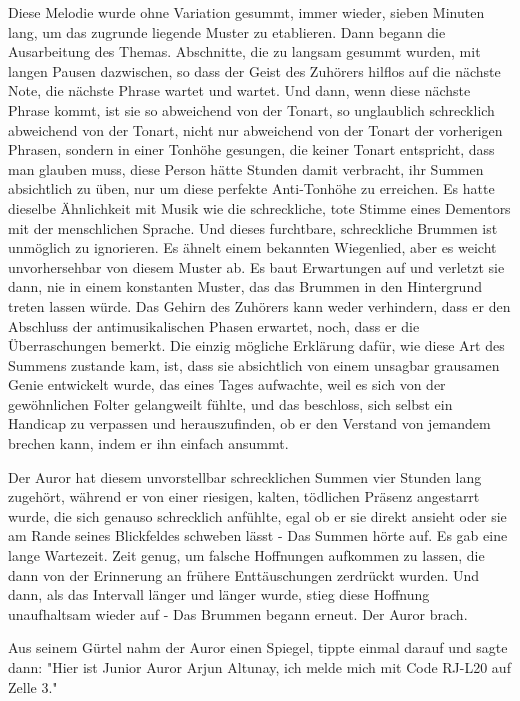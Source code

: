 {Diese Melodie wurde ohne Variation gesummt, immer wieder, sieben Minuten lang, um das zugrunde liegende Muster zu etablieren. Dann begann die Ausarbeitung des Themas. Abschnitte, die zu langsam gesummt wurden, mit langen Pausen dazwischen, so dass der Geist des Zuhörers hilflos auf die nächste Note, die nächste Phrase wartet und wartet. Und dann, wenn diese nächste Phrase kommt, ist sie so abweichend von der Tonart, so unglaublich schrecklich abweichend von der Tonart, nicht nur abweichend von der Tonart der vorherigen Phrasen, sondern in einer Tonhöhe gesungen, die keiner Tonart entspricht, dass man glauben muss, diese Person hätte Stunden damit verbracht, ihr Summen absichtlich zu üben, nur um diese perfekte Anti-Tonhöhe zu erreichen. Es hatte dieselbe Ähnlichkeit mit Musik wie die schreckliche, tote Stimme eines Dementors mit der menschlichen Sprache. Und dieses furchtbare, schreckliche Brummen ist unmöglich zu ignorieren. Es ähnelt einem bekannten Wiegenlied, aber es weicht unvorhersehbar von diesem Muster ab. Es baut Erwartungen auf und verletzt sie dann, nie in einem konstanten Muster, das das Brummen in den Hintergrund treten lassen würde. Das Gehirn des Zuhörers kann weder verhindern, dass er den Abschluss der antimusikalischen Phasen erwartet, noch, dass er die Überraschungen bemerkt. Die einzig mögliche Erklärung dafür, wie diese Art des Summens zustande kam, ist, dass sie absichtlich von einem unsagbar grausamen Genie entwickelt wurde, das eines Tages aufwachte, weil es sich von der gewöhnlichen Folter gelangweilt fühlte, und das beschloss, sich selbst ein Handicap zu verpassen und herauszufinden, ob er den Verstand von jemandem brechen kann, indem er ihn einfach ansummt.

Der Auror hat diesem unvorstellbar schrecklichen Summen vier Stunden lang zugehört, während er von einer riesigen, kalten, tödlichen Präsenz angestarrt wurde, die sich genauso schrecklich anfühlte, egal ob er sie direkt ansieht oder sie am Rande seines Blickfeldes schweben lässt - Das Summen hörte auf. Es gab eine lange Wartezeit. Zeit genug, um falsche Hoffnungen aufkommen zu lassen, die dann von der Erinnerung an frühere Enttäuschungen zerdrückt wurden. Und dann, als das Intervall länger und länger wurde, stieg diese Hoffnung unaufhaltsam wieder auf - Das Brummen begann erneut. Der Auror brach.

Aus seinem Gürtel nahm der Auror einen Spiegel, tippte einmal darauf und sagte dann: "Hier ist Junior Auror Arjun Altunay, ich melde mich mit Code RJ-L20 auf Zelle 3."

}

